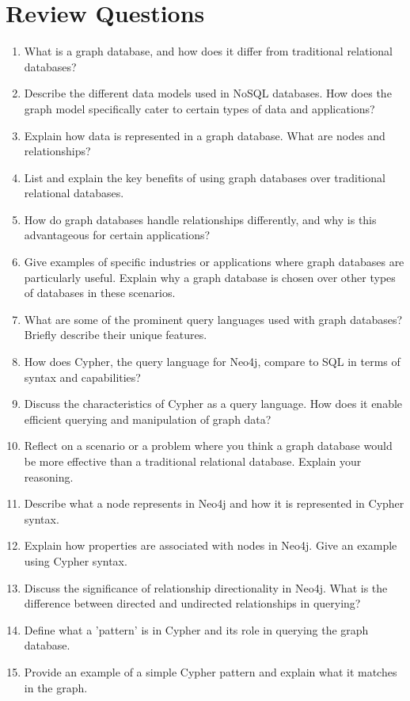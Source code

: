 \section{Review Questions}

\begin{enumerate}[nosep]
	\item What is a graph database, and how does it differ from traditional relational databases?
	\item Describe the different data models used in NoSQL databases. How does the graph model specifically cater to certain types of data and applications?
	\item Explain how data is represented in a graph database. What are nodes and relationships?
	\item List and explain the key benefits of using graph databases over traditional relational databases.
	\item How do graph databases handle relationships differently, and why is this advantageous for certain applications?
	\item Give examples of specific industries or applications where graph databases are particularly useful. Explain why a graph database is chosen over other types of databases in these scenarios.
	\item What are some of the prominent query languages used with graph databases? Briefly describe their unique features.
	\item How does Cypher, the query language for Neo4j, compare to SQL in terms of syntax and capabilities?
	\item Discuss the characteristics of Cypher as a query language. How does it enable efficient querying and manipulation of graph data?
	\item Reflect on a scenario or a problem where you think a graph database would be more effective than a traditional relational database. Explain your reasoning.
    \item Describe what a node represents in Neo4j and how it is represented in Cypher syntax.
    \item Explain how properties are associated with nodes in Neo4j. Give an example using Cypher syntax.
	\item Discuss the significance of relationship directionality in Neo4j. What is the difference between directed and undirected relationships in querying?
	\item Define what a 'pattern' is in Cypher and its role in querying the graph database.
	\item Provide an example of a simple Cypher pattern and explain what it matches in the graph.

\end{enumerate}
